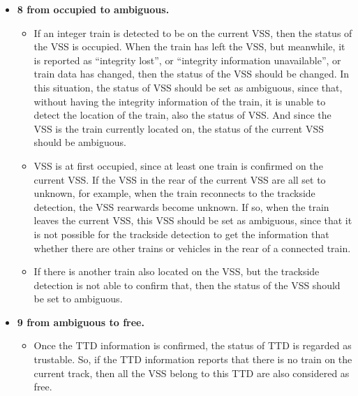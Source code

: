 \documentclass[article,dr=phil,type=drfinal,colorback,accentcolor=tud9c]{tudthesis}
\begin{document}
\begin{itemize}
\begin{itemize}
    \end{itemize}  
  	
  	\item \textbf{8 from occupied to ambiguous.}
  	
  	\begin{itemize}
	
	\item 
	
	If an integer train is detected to be on the current VSS, then the status of the VSS is occupied. When the train has left the VSS, but meanwhile, it is reported as ``integrity lost'', or ``integrity information unavailable'', or train data has changed, then the status of the VSS should be changed. In this situation, the status of VSS should be set as ambiguous, since that, without having the integrity information of the train, it is unable to detect the location of the train, also the status of VSS. And since the VSS is the train currently located on, the status of the current VSS should be ambiguous.
	
	\item 
	
	VSS is at first occupied, since at least one train is confirmed on the current VSS. If the VSS in the rear of the current VSS are all set to unknown, for example, when the train reconnects to the trackside detection, the VSS rearwards become unknown. If so, when the train leaves the current VSS, this VSS should be set as ambiguous, since that it is not possible for the trackside detection to get the information that whether there are other trains or vehicles in the rear of a connected train.
	
	\item 
	
	If there is another train also located on the VSS, but the trackside detection is not able to confirm that, then the status of the VSS should be set to ambiguous.
	
    \end{itemize}  
  	
  	\item \textbf{9 from ambiguous to free.}
  	
  	\begin{itemize}
	
	\item 
	
	Once the TTD information is confirmed, the status of TTD is regarded as trustable. So, if the TTD information reports that there is no train on the current track, then all the VSS belong to this TTD are also considered as free.
	

\end{itemize}
\end{itemize}
\end{document}
